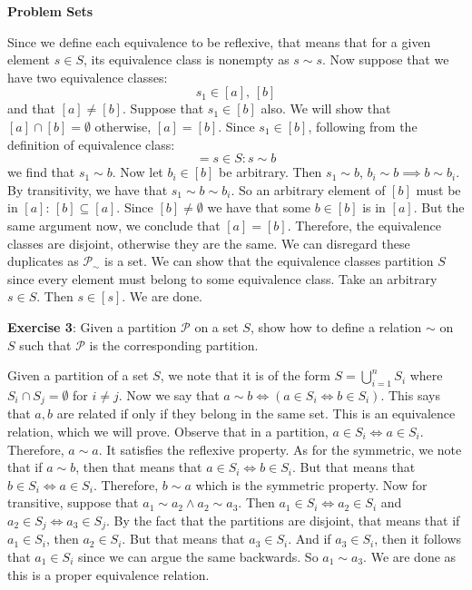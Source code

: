 \documentclass{report}
\begin{document}
\begin{exercises}{\textbf{Problem Sets}}
    \begin{answer}
        Since we define each equivalence to be reflexive, that means that for a given element $s \in S$, its equivalence class is nonempty as $s \sim s$. Now suppose that we have two equivalence classes: 
        \begin{equation*}
            s_{1} \in [a], \, [b]
        \end{equation*}
        and that $[a] \neq [b]$. Suppose that $s_{1} \in [b]$ also. We will show that $[a] \cap [b] = \emptyset$ otherwise, $[a] = [b]$. Since $s_{1} \in [b]$, following from the definition of equivalence class:
        \begin{equation*}
            [b] = {s \in S : s \sim b}
        \end{equation*}
        we find that $s_{1} \sim b$. Now let $b_{i} \in [b]$ be arbitrary. Then $s_{1} \sim b$, $b_{i} \sim b \implies b \sim b_{i}$. By transitivity, we have that $s_{1} \sim b \sim b_{i}$. So an arbitrary element of $[b]$ must be in $[a]$: $[b] \subseteq [a]$. Since $[b] \neq \emptyset$ we have that some $b \in [b]$ is in $[a]$. But the same argument now, we conclude that $[a] = [b]$. Therefore, the equivalence classes are disjoint, otherwise they are the same. We can disregard these duplicates as $\mathcal{P}_{\sim }$ is a set. We can show that the equivalence classes partition $S$ since every element must belong to some equivalence class. Take an arbitrary $s \in S$. Then $s \in [s]$. We are done.
    \end{answer}

    \textbf{Exercise 3}: Given a partition $\mathcal{P}$ on a set $S$, show how to define a relation $\sim $ on $S$ such that $\mathcal{P}$ is the corresponding partition.

    \begin{answer}
        Given a partition of a set $S$, we note that it is of the form $S = \bigcup_{i = 1}^{n}S_{i}$ where $S_{i} \cap S_{j} = \emptyset$ for $i \neq j$. Now we say that $a \sim b \iff (a \in S_{i} \iff  b \in S_{i})$. This says that $a, b$ are related if only if they belong in the same set. This is an equivalence relation, which we will prove. Observe that in a partition, $a \in S_{i} \iff a \in S_{i}$. Therefore, $a \sim a$. It satisfies the reflexive property. As for the symmetric, we note that if $a \sim b$, then that means that $a \in S_{i} \iff b \in S_{i}$. But that means that $b \in S_{i} \iff a \in S_{i}$. Therefore, $b \sim a$ which is the symmetric property. Now for transitive, suppose that $a_{1} \sim a_{2} \land a_{2} \sim a_{3}$. Then $a_{1} \in S_{i} \iff a_{2} \in S_{i}$ and $a_{2} \in S_{j} \iff a_{3} \in S_{j}$. By the fact that the partitions are disjoint, that means that if $a_{1} \in S_{i}$, then $a_{2} \in S_{i}$. But that means that $a_{3} \in S_{i}$. And if $a_{3} \in S_{i}$, then it follows that $a_{1} \in S_{i}$ since we can argue the same backwards. So $a_{1} \sim a_{3}$. We are done as this is a proper equivalence relation.
    \end{answer}


\end{exercises}
\end{document}
